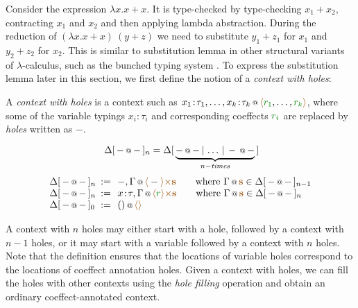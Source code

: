 Consider the expression $\lambda x.x+x$. It is type-checked by type-checking $x_1 + x_2$,
contracting $x_1$ and $x_2$ and then applying lambda abstraction. During the reduction of
$(\lambda x.x+x)~(y+z)$ we need to substitute $y_1+z_1$ for $x_1$ and $y_2+z_2$ for $x_2$.
This is similar to substitution lemma in other structural variants of $\lambda$-calculus,
such as the bunched typing system \cite{substruct-bunched}. To express the substitution
lemma later in this section, we first define the notion of a \emph{context with holes}:

\begin{definition}
A \emph{context with holes} is a context such as $\coctx{x_1\!:\!\tau_1, \ldots, x_k\!:\!\tau_k}{\alift{\cclrd{r_1}, \ldots, \cclrd{r_k}}}$,
where some of the variable typings $x_i\!:\!\tau_i$ and corresponding coeffects $\cclrd{r_i}$
are replaced by \emph{holes} written as $-$.

\begin{equation*}
~\Delta[\,\coctx{-}{-}\,]_n = \Delta[\,\underbrace{\coctx{-}{-} \,|\, \ldots \,|\, \coctx{-}{-}}_{ n-\textit{times} } \,]
\end{equation*}
\begin{equation*}
\begin{array}{lcl}
 \Delta[\,\coctx{-}{-}\,]_n &\narrow{:=}&
   \coctx{-, \Gamma}{\alift{-} \atimes \aclrd{\textbf{s}} }
   \qquad \textnormal{where}~\coctx{\Gamma}{\aclrd{\textbf{s}}} \in \Delta[\,\coctx{-}{-}\,]_{n-1} \\
 \Delta[\,\coctx{-}{-}\,]_n &\narrow{:=}&
   \coctx{x\!:\!\tau, \Gamma}{\alift{\cclrd{r}} \atimes \aclrd{\textbf{s}} }
   \qquad \textnormal{where}~\coctx{\Gamma}{\aclrd{\textbf{s}}} \in \Delta[\,\coctx{-}{-}\,]_n \\
 \Delta[\,\coctx{-}{-}\,]_0 &\narrow{:=}&
   \coctx{()}{\alift{}}
\end{array}
\end{equation*}
\end{definition}

\noindent
A context with $n$ holes may either start with a hole, followed by a context with $n-1$ holes, or it may
start with a variable followed by a context with $n$ holes. Note that the definition ensures that
the locations of variable holes correspond to the locations of coeffect annotation holes. Given a context
with holes, we can fill the holes with other contexts using the \emph{hole filling} operation and
obtain an ordinary coeffect-annotated context.

